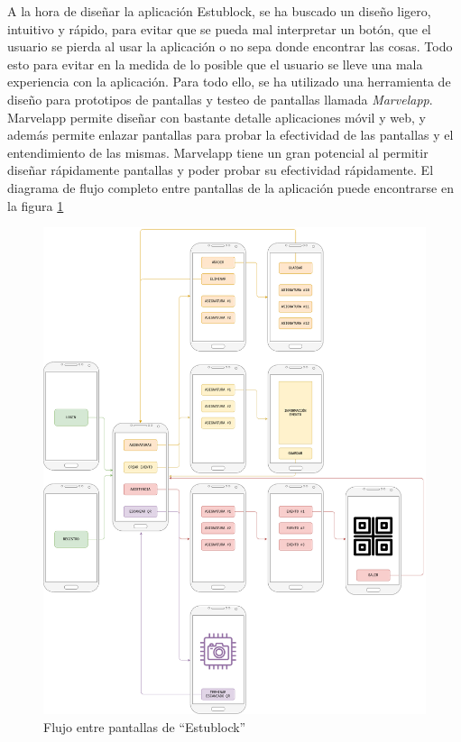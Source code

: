 A la hora de diseñar la aplicación Estublock, se ha buscado un diseño ligero, intuitivo y rápido, para evitar que se pueda mal interpretar un botón, que el usuario se pierda al usar la aplicación o no sepa donde encontrar las cosas. Todo esto para evitar en la medida de lo posible que el usuario se lleve una mala experiencia con la aplicación. Para todo ello, se ha utilizado una herramienta de diseño para prototipos de pantallas y testeo de pantallas llamada \emph{Marvelapp}\cite{marvelapp}. Marvelapp permite diseñar con bastante detalle aplicaciones móvil y web, y además permite enlazar pantallas para probar la efectividad de las pantallas y el entendimiento de las mismas. Marvelapp tiene un gran potencial al permitir diseñar rápidamente pantallas y poder probar su efectividad rápidamente. El diagrama de flujo completo entre pantallas de la aplicación puede encontrarse en la figura \ref{fig:diagramaCompleto}\\

\begin{figure}[h!]
  \centering
  \includegraphics[width=1\linewidth]{figs/Desarrollo/Interfaz/diagrama_completo}
  \caption[Flujo entre pantallas de ``Estublock'']{Flujo entre pantallas de ``Estublock''}
  \label{fig:diagramaCompleto}
\end{figure}

